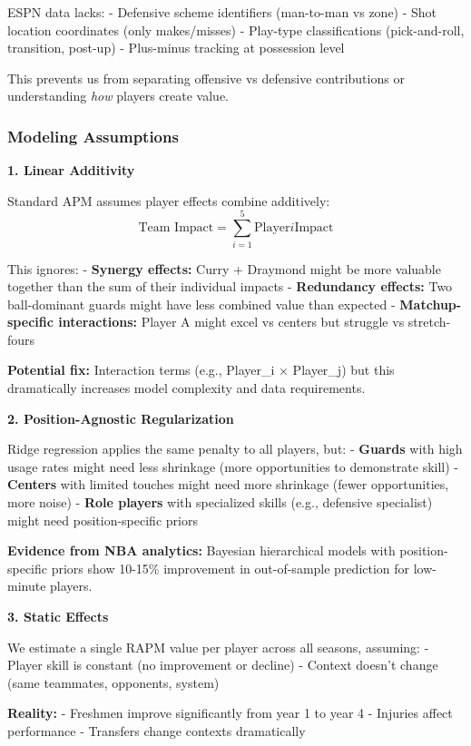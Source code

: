 \documentclass[
  letterpaper,
  DIV=11,
  numbers=noendperiod]{scrartcl}
\begin{document}
ESPN data lacks: - Defensive scheme identifiers (man-to-man vs zone) -
Shot location coordinates (only makes/misses) - Play-type
classifications (pick-and-roll, transition, post-up) - Plus-minus
tracking at possession level

This prevents us from separating offensive vs defensive contributions or
understanding \emph{how} players create value.

\subsubsection{Modeling Assumptions}\label{modeling-assumptions}

\textbf{1. Linear Additivity}

Standard APM assumes player effects combine additively:
\[\text{Team Impact} = \sum_{i=1}^{5} \text{Player}i\text{Impact}\]

This ignores: - \textbf{Synergy effects:} Curry + Draymond might be more
valuable together than the sum of their individual impacts -
\textbf{Redundancy effects:} Two ball-dominant guards might have less
combined value than expected - \textbf{Matchup-specific interactions:}
Player A might excel vs centers but struggle vs stretch-fours

\textbf{Potential fix:} Interaction terms (e.g., Player\_i × Player\_j)
but this dramatically increases model complexity and data requirements.

\textbf{2. Position-Agnostic Regularization}

Ridge regression applies the same penalty to all players, but: -
\textbf{Guards} with high usage rates might need less shrinkage (more
opportunities to demonstrate skill) - \textbf{Centers} with limited
touches might need more shrinkage (fewer opportunities, more noise) -
\textbf{Role players} with specialized skills (e.g., defensive
specialist) might need position-specific priors

\textbf{Evidence from NBA analytics:} Bayesian hierarchical models with
position-specific priors show 10-15\% improvement in out-of-sample
prediction for low-minute players.

\textbf{3. Static Effects}

We estimate a single RAPM value per player across all seasons, assuming:
- Player skill is constant (no improvement or decline) - Context doesn't
change (same teammates, opponents, system)

\textbf{Reality:} - Freshmen improve significantly from year 1 to year 4
- Injuries affect performance - Transfers change contexts dramatically
\end{document}
